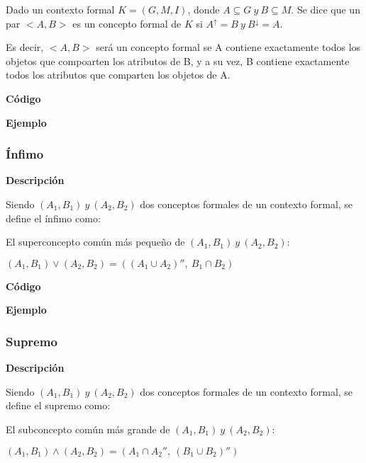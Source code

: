         Dado un contexto formal \( K = (G, M, I) \), donde \( A \subseteq G ~ y ~ B \subseteq M \). Se dice que un par \( <A,B> \) es un 
        concepto formal de \(K\) si \( A^\uparrow = B ~ y ~ B^\downarrow = A\).
        
        Es decir, \( <A,B> \) ser\'a un concepto formal se A contiene exactamente todos los objetos que compoarten los atributos de B, y a su 
        vez, B contiene exactamente todos los atributos que comparten los objetos de A.

        \textbf{C\'odigo}

        

        \textbf{Ejemplo}



    \subsubsection{\'Infimo}

    
        \textbf{Descripci\'on}

        Siendo \((A_{1}, B_{1}) ~ y ~ (A_{2}, B_{2})\) dos conceptos formales de un contexto formal, se define el \'infimo como:

        El superconcepto com\'un m\'as peque\~no de \((A_{1}, B_{1}) ~ y ~ (A_{2}, B_{2})\):

        \( (A_{1}, B_{1}) \vee (A_{2}, B_{2}) = ((A_{1} \cup A_{2})'', ~ B_{1}\cap B_{2}) \)

        \textbf{C\'odigo}

        

        

        \textbf{Ejemplo}



    \subsubsection{Supremo}

    
        \textbf{Descripci\'on}

        Siendo \((A_{1}, B_{1}) ~ y ~ (A_{2}, B_{2})\) dos conceptos formales de un contexto formal, se define el supremo como:

        El subconcepto com\'un m\'as grande de \((A_{1}, B_{1}) ~ y ~ (A_{2}, B_{2})\):

        \( (A_{1}, B_{1}) \wedge (A_{2}, B_{2}) = (A_{1} \cap A_{2}'', ~ (B_{1}\cup B_{2})'') \)


